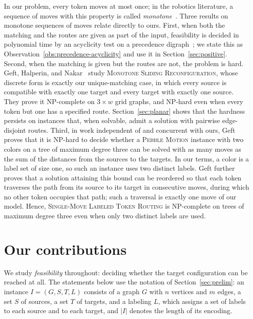 \documentclass[a4paper,USenglish,thm-restate]{lipics-v2021}
\theoremstyle{problemstyle}
\begin{document}
In our problem, every token moves at most once; in the robotics
literature, a sequence of moves with this property is called
\emph{monotone}~\cite{StilmanKuffner2008}. Three results on monotone sequences of
moves relate directly to ours. First, when both the
matching and the routes are given as part of the input, feasibility is
decided in polynomial time by an acyclicity test on a precedence
digraph~\cite{DBLP:conf/icra/Buckley89,%
DBLP:journals/comgeo/AbellanasBHORT06}; we state this as
Observation~\ref{obs:precedence-acyclicity} and use it in
Section~\ref{sec:positive}. Second, when the matching is given but the
routes are not, the problem is hard. Geft, Halperin, and
Nakar~\cite{GeftHalperinNakar2024} study \textsc{Monotone Sliding
Reconfiguration}, whose discrete form is exactly our unique-matching case,
in which every source is compatible with exactly one target and every
target with exactly one source. They prove it \textsf{NP}-complete on
$3\times w$ grid graphs, and \textsf{NP}-hard even when every token but one
has a specified route. Section~\ref{sec:planar} shows that the hardness
persists on instances that, when solvable, admit a solution with pairwise
edge-disjoint routes. Third, in
work independent of and concurrent with ours, Geft~\cite{Geft2026Trees}
proves that it is \textsf{NP}-hard to decide whether a \textsc{Pebble
Motion} instance with two colors on a tree of maximum degree three can be
solved with as many moves as the sum of the distances from the sources to
the targets. In our terms, a color is a label set of size one, so such an
instance uses two distinct labels. Geft further proves that a solution
attaining this bound can be reordered so that each token traverses the
path from its source to its target in consecutive moves, during which no
other token occupies that path; such a
traversal is exactly one move of our model. Hence,
\textsc{Single-Move Labeled Token Routing} is \textsf{NP}-complete on trees
of maximum degree three even when only two distinct labels are used.

\section{Our contributions}
\label{sec:our_contributions}

We study \emph{feasibility} throughout: deciding whether the target
configuration can be reached at all. The statements below use the notation
of Section~\ref{sec:prelim}: an instance $I=(G,S,T,L)$ consists of a graph
$G$ with $n$ vertices and $m$ edges, a set $S$ of sources, a set $T$ of
targets, and a labeling $L$, which assigns a set of labels to each source
and to each target, and $|I|$ denotes the length of its encoding.
\end{document}

